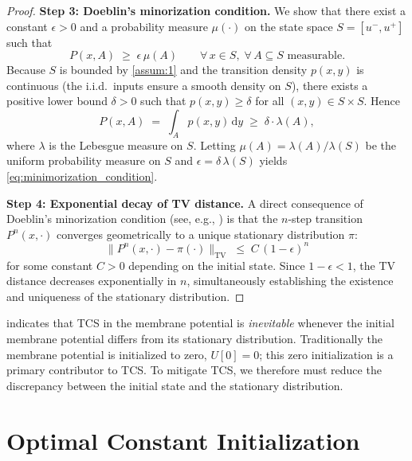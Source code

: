 \begin{proof}
\medskip
\noindent\textbf{Step 3: Doeblin's minorization condition.}
We show that there exist a constant $\epsilon>0$ and a probability measure $\mu(\cdot)$ on the state space $S=[u^{-},u^{+}]$ such that
\begin{equation}
\label{eq:minimorization_condition}
    P(x,A) \;\ge\; \epsilon\,\mu(A)
    \qquad \forall\, x\in S,\;\forall\, A\subseteq S \text{ measurable.}
\end{equation}
Because $S$ is bounded by \cref{assum:1} and the transition density $p(x,y)$ is continuous (the i.i.d.\ inputs ensure a smooth density on $S$), there exists a positive lower bound $\delta>0$ such that $p(x,y)\ge\delta$ for all $(x,y)\in S\times S$. Hence
\begin{equation}
    P(x,A) \;=\; \int_{A} p(x,y)\,\mathrm{d}y \;\ge\; \delta\cdot \lambda(A),
\end{equation}
where $\lambda$ is the Lebesgue measure on $S$. Letting $\mu(A)=\lambda(A)/\lambda(S)$ be the uniform probability measure on $S$ and $\epsilon=\delta\,\lambda(S)$ yields \cref{eq:minimorization_condition}.

\medskip
\noindent\textbf{Step 4: Exponential decay of TV distance.}
A direct consequence of Doeblin's minorization condition (see, e.g., \cite{rosenthal:1995}) is that the $n$-step transition $P^{n}(x,\cdot)$ converges geometrically to a unique stationary distribution $\pi$:
\begin{equation}
\label{eq:convergence_speed}
    \bigl\|P^{n}(x,\cdot)-\pi(\cdot)\bigr\|_{\mathrm{TV}} \;\le\; C\,(1-\epsilon)^{n}
\end{equation}
for some constant $C>0$ depending on the initial state. Since $1-\epsilon<1$, the TV distance decreases exponentially in $n$, simultaneously establishing the existence and uniqueness of the stationary distribution.
\end{proof}

 indicates that TCS in the membrane potential is \emph{inevitable} whenever the initial membrane potential differs from its stationary distribution. Traditionally the membrane potential is initialized to zero, $U[0]=0$; this zero initialization is a primary contributor to TCS. To mitigate TCS, we therefore must reduce the discrepancy between the initial state and the stationary distribution.

\section{Optimal Constant Initialization}
\label{sec:mpinit_lemma}

